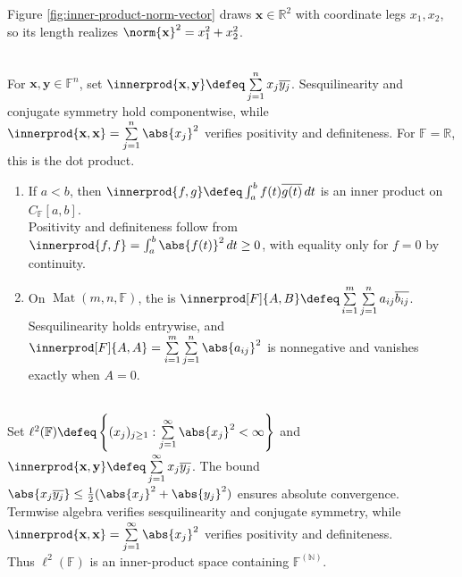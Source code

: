 Figure \ref{fig:inner-product-norm-vector} draws $\mathbf{x}\in\mathbb{R}^2$ with coordinate legs $x_1,x_2$, so its length realizes $\norm{\mathbf{x}}^2=x_1^2+x_2^2$.

\begin{example} \label{ex:standard-inner-product-on-fn} \\
For $\mathbf{x},\mathbf{y}\in\mathbb{F}^n$, set $\innerprod{\mathbf{x},\mathbf{y}}\defeq\sum\limits_{j=1}^{n}x_j\overline{y_j}$. Sesquilinearity and conjugate symmetry hold componentwise, while $\innerprod{\mathbf{x},\mathbf{x}}=\sum\limits_{j=1}^{n}\abs{x_j}^2$ verifies positivity and definiteness. For $\mathbb{F}=\mathbb{R}$, this is the dot product.
\end{example}

\begin{example} \label{ex:function-and-matrix-inner-products} 
\begin{enumerate}[label=(\roman*)]
\setlength{\itemsep}{0pt}
\item If $a<b$, then $\innerprod{f,g}\defeq\int_a^b f(t)\overline{g(t)}\,dt$ is an inner product on $C_{\mathbb{F}}[a,b]$.\\
Positivity and definiteness follow from $\innerprod{f,f}=\int_a^b\abs{f(t)}^2\,dt\geq0$, with equality only for $f=0$ by continuity.
\item On $\operatorname{Mat}(m,n,\mathbb{F})$, the  is $\innerprod[F]{A,B}\defeq\sum\limits_{i=1}^{m}\sum\limits_{j=1}^{n}a_{ij}\overline{b_{ij}}$.\\
Sesquilinearity holds entrywise, and $\innerprod[F]{A,A}=\sum\limits_{i=1}^{m}\sum\limits_{j=1}^{n}\abs{a_{ij}}^2$ is nonnegative and vanishes exactly when $A=0$.
\end{enumerate}
\end{example}

\begin{example} \label{ex:square-summable-sequence-inner-product} \\
Set $\ell^2(\mathbb{F})\defeq\left\{(x_j)_{j\geq1}:\sum\limits_{j=1}^{\infty}\abs{x_j}^2<\infty\right\}$ and $\innerprod{\mathbf{x},\mathbf{y}}\defeq\sum\limits_{j=1}^{\infty}x_j\overline{y_j}$. The bound $\abs{x_j\overline{y_j}}\leq\frac{1}{2}(\abs{x_j}^2+\abs{y_j}^2)$ ensures absolute convergence.\\
Termwise algebra verifies sesquilinearity and conjugate symmetry, while $\innerprod{\mathbf{x},\mathbf{x}}=\sum\limits_{j=1}^{\infty}\abs{x_j}^2$ verifies positivity and definiteness.\\
Thus $\ell^2(\mathbb{F})$ is an inner-product space containing $\mathbb{F}^{(\mathbb{N})}$.
\end{example}

